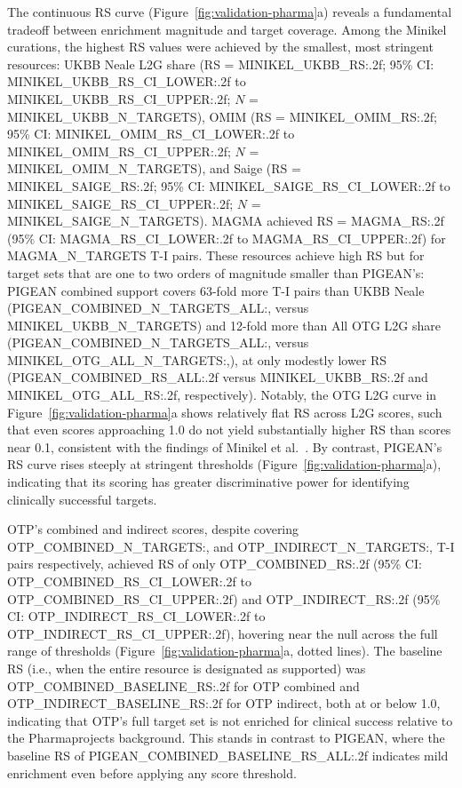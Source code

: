 The continuous RS curve (Figure~\ref{fig:validation-pharma}a) reveals a fundamental tradeoff between enrichment magnitude and target coverage. Among the Minikel curations, the highest RS values were achieved by the smallest, most stringent resources: UKBB Neale L2G share (RS = {{MINIKEL_UKBB_RS:.2f}}; 95\% CI: {{MINIKEL_UKBB_RS_CI_LOWER:.2f}} to {{MINIKEL_UKBB_RS_CI_UPPER:.2f}}; $N$ = {{MINIKEL_UKBB_N_TARGETS}}), OMIM (RS = {{MINIKEL_OMIM_RS:.2f}}; 95\% CI: {{MINIKEL_OMIM_RS_CI_LOWER:.2f}} to {{MINIKEL_OMIM_RS_CI_UPPER:.2f}}; $N$ = {{MINIKEL_OMIM_N_TARGETS}}), and Saige (RS = {{MINIKEL_SAIGE_RS:.2f}}; 95\% CI: {{MINIKEL_SAIGE_RS_CI_LOWER:.2f}} to {{MINIKEL_SAIGE_RS_CI_UPPER:.2f}}; $N$ = {{MINIKEL_SAIGE_N_TARGETS}}). MAGMA achieved RS = {{MAGMA_RS:.2f}} (95\% CI: {{MAGMA_RS_CI_LOWER:.2f}} to {{MAGMA_RS_CI_UPPER:.2f}}) for {{MAGMA_N_TARGETS}} T-I pairs. These resources achieve high RS but for target sets that are one to two orders of magnitude smaller than PIGEAN's: PIGEAN combined support covers 63-fold more T-I pairs than UKBB Neale ({{PIGEAN_COMBINED_N_TARGETS_ALL:,}} versus {{MINIKEL_UKBB_N_TARGETS}}) and 12-fold more than All OTG L2G share ({{PIGEAN_COMBINED_N_TARGETS_ALL:,}} versus {{MINIKEL_OTG_ALL_N_TARGETS:,}}), at only modestly lower RS ({{PIGEAN_COMBINED_RS_ALL:.2f}} versus {{MINIKEL_UKBB_RS:.2f}} and {{MINIKEL_OTG_ALL_RS:.2f}}, respectively). Notably, the OTG L2G curve in Figure~\ref{fig:validation-pharma}a shows relatively flat RS across L2G scores, such that even scores approaching 1.0 do not yield substantially higher RS than scores near 0.1, consistent with the findings of Minikel et al.\ \cite{minikel_refining_2024}. By contrast, PIGEAN's RS curve rises steeply at stringent thresholds (Figure~\ref{fig:validation-pharma}a), indicating that its scoring has greater discriminative power for identifying clinically successful targets.

OTP's combined and indirect scores, despite covering {{OTP_COMBINED_N_TARGETS:,}} and {{OTP_INDIRECT_N_TARGETS:,}} T-I pairs respectively, achieved RS of only {{OTP_COMBINED_RS:.2f}} (95\% CI: {{OTP_COMBINED_RS_CI_LOWER:.2f}} to {{OTP_COMBINED_RS_CI_UPPER:.2f}}) and {{OTP_INDIRECT_RS:.2f}} (95\% CI: {{OTP_INDIRECT_RS_CI_LOWER:.2f}} to {{OTP_INDIRECT_RS_CI_UPPER:.2f}}), hovering near the null across the full range of thresholds (Figure~\ref{fig:validation-pharma}a, dotted lines). The baseline RS (i.e., when the entire resource is designated as supported) was {{OTP_COMBINED_BASELINE_RS:.2f}} for OTP combined and {{OTP_INDIRECT_BASELINE_RS:.2f}} for OTP indirect, both at or below 1.0, indicating that OTP's full target set is not enriched for clinical success relative to the Pharmaprojects background. This stands in contrast to PIGEAN, where the baseline RS of {{PIGEAN_COMBINED_BASELINE_RS_ALL:.2f}} indicates mild enrichment even before applying any score threshold.

